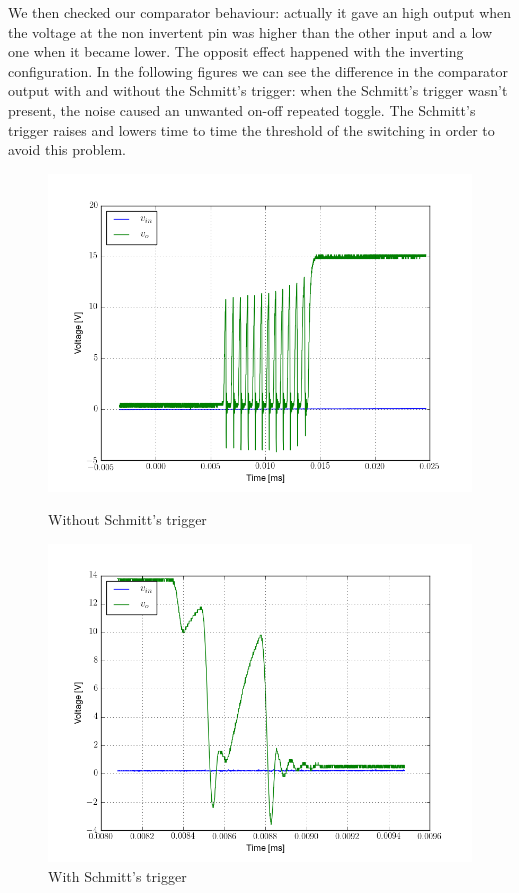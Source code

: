 We then checked our comparator behaviour: actually it gave an high output when the voltage at the non invertent pin was higher than the other input and a low one when it became lower. The opposit effect happened with the inverting configuration.
In the following figures we can see the difference in the comparator output with and without the Schmitt's trigger: when the Schmitt's trigger wasn't present, the noise caused an unwanted on-off repeated toggle. The Schmitt's trigger raises and lowers time to time the threshold of the switching in order to avoid this problem.
\begin{figure}[H]
\begin{minipage}{.5\textwidth}
\centering
\includegraphics[width=\textwidth]{5/noise.png}
\caption{Without Schmitt's trigger}
\end{minipage}%
\begin{minipage}{.5\textwidth}
\centering
\includegraphics[width=\textwidth]{5/schmitt.png}
\caption{With Schmitt's trigger}
\end{minipage}
\end{figure}
